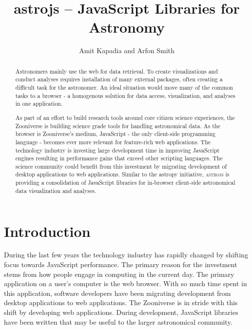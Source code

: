 
\resetcounters




\title{astrojs -- JavaScript Libraries for Astronomy}
\author{Amit Kapadia and Arfon Smith
}


\begin{abstract}
Astronomers mainly use the web for data retrieval. To create visualizations and conduct analyses requires installation of many external packages, often creating a difficult task for the astronomer. An ideal situation would move many of the common tasks to a browser - a homogenous solution for data access, visualization, and analyses in one application.

As part of an effort to build research tools around core citizen science experiences, the Zooniverse is building science grade tools for handling astronomical data. As the browser is Zooniverse's medium, JavaScript - the only client-side programming language - becomes ever more relevant for feature-rich web applications. The technology industry is investing large development time in improving JavaScript engines resulting in performance gains that exceed other scripting languages. The science community could benefit from this investment by migrating development of desktop applications to web applications.  Similar to the astropy initiative, \textsc{astrojs} is providing a consolidation of JavaScript libraries for in-browser client-side astronomical data visualization and analyses.
\end{abstract}

\section{Introduction}
During the last few years the technology industry has rapidly changed by shifting focus towards JavaScript performance.  The primary reason for the investment stems from how people engage in computing in the current day.  The primary application on a user's computer is the web browser.  With so much time spent in this application, software developers have been migrating development from desktop applications to web applications.  The Zooniverse is in stride with this shift by developing web applications.  During development, JavaScript libraries have been written that may be useful to the larger astronomical community.


